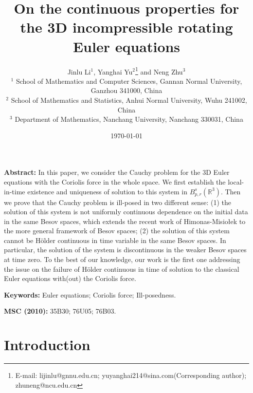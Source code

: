 \documentclass[12pt]{article}
\newcommand{\R}{\mathbb{R}}
\begin{document}

\title{On the continuous properties for the 3D incompressible rotating Euler equations}

\author{Jinlu Li$^{1}$,
Yanghai Yu$^{2}$\footnote{E-mail: lijinlu@gnnu.edu.cn; yuyanghai214@sina.com(Corresponding author); zhuneng@ncu.edu.cn} and Neng Zhu$^{3}$\\
\small $^1$ School of Mathematics and Computer Sciences, Gannan Normal University, Ganzhou 341000, China\\
\small $^2$ School of Mathematics and Statistics, Anhui Normal University, Wuhu 241002, China\\
\small $^3$ Department of Mathematics, Nanchang University, Nanchang 330031, China }




\date{\today}


\maketitle\noindent{\hrulefill}

{\bf Abstract:} In this paper, we consider the Cauchy problem for the 3D Euler equations with the Coriolis force in the whole space. We first establish the local-in-time existence and uniqueness of solution to this system in $B^s_{p,r}(\R^3)$. Then we prove that the Cauchy problem is ill-posed in two different sense:
(1) the solution of this system is not uniformly continuous dependence on the initial data in the same Besov spaces, which extends the recent work of Himonas-Misio{\l}ek \cite[Comm. Math. Phys., 296, 2010]{HM1} to the more general framework of Besov spaces;
(2) the solution of this system cannot be H\"{o}lder continuous in time variable in the same Besov spaces. In particular, the solution of the system is discontinuous in the weaker Besov spaces at time zero. To the best of our knowledge, our work is the first one addressing the issue on the failure of H\"{o}lder continuous in time of solution to the classical Euler equations with(out) the Coriolis force.



{\bf Keywords:} Euler equations; Coriolis force; Ill-posedness.

{\bf MSC (2010):} 35B30; 76U05; 76B03.
\vskip0mm\noindent{\hrulefill}

\section{Introduction}
\end{document}
